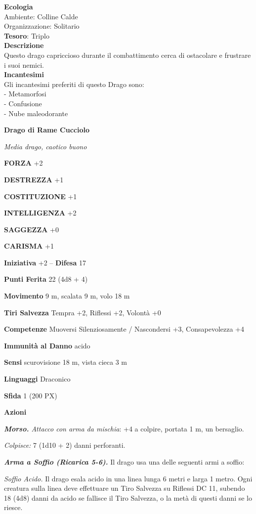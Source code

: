\begin{multicols}{2}
	\textbf{Ecologia}\\
	Ambiente: Colline Calde\\
	Organizzazione: Solitario\\
	\textbf{Tesoro}: Triplo\\
	\textbf{Descrizione}\\
	Questo drago capriccioso durante il combattimento cerca di ostacolare e frustrare i suoi nemici.\\
	\textbf{Incantesimi}\\
	Gli incantesimi preferiti di questo Drago sono:\\
	- Metamorfosi\\
	- Confusione\\
	- Nube maleodorante

	\medskip\textbf{Drago di Rame Cucciolo}

	\textit{Media drago, caotico buono}

	\textbf{FORZA} +2

	\textbf{DESTREZZA} +1

	\textbf{COSTITUZIONE} +1

	\textbf{INTELLIGENZA} +2

	\textbf{SAGGEZZA} +0

	\textbf{CARISMA} +1

	\textbf{Iniziativa} +2 -- \textbf{Difesa} 17

	\textbf{Punti Ferita} 22 (4d8 + 4)

	\textbf{Movimento} 9 m, scalata 9 m, volo 18 m

	\textbf{Tiri Salvezza} Tempra +2, Riflessi +2, Volontà +0

	\textbf{Competenze} Muoversi Silenziosamente / Nascondersi +3, Consapevolezza +4

	\textbf{Immunità al Danno} acido

	\textbf{Sensi} scurovisione 18 m, vista cieca 3 m

	\textbf{Linguaggi} Draconico

	\textbf{Sfida} 1 (200 PX)

	\textbf{Azioni}

	\textit{\textbf{Morso.} Attacco con arma da mischia}: +4 a colpire, portata 1 m, un bersaglio.

	\textit{Colpisce:} 7 (1d10 + 2) danni perforanti.

	\textit{\textbf{Arma a Soffio (Ricarica 5-6).}} Il drago usa una delle seguenti armi a soffio:

	\textit{Soffio Acido.} Il drago esala acido in una linea lunga 6 metri e larga 1 metro. Ogni creatura sulla linea deve effettuare un Tiro Salvezza su Riflessi DC 11, subendo 18 (4d8) danni da acido se fallisce il Tiro Salvezza, o la metà di questi danni se lo riesce.


\end{multicols}
